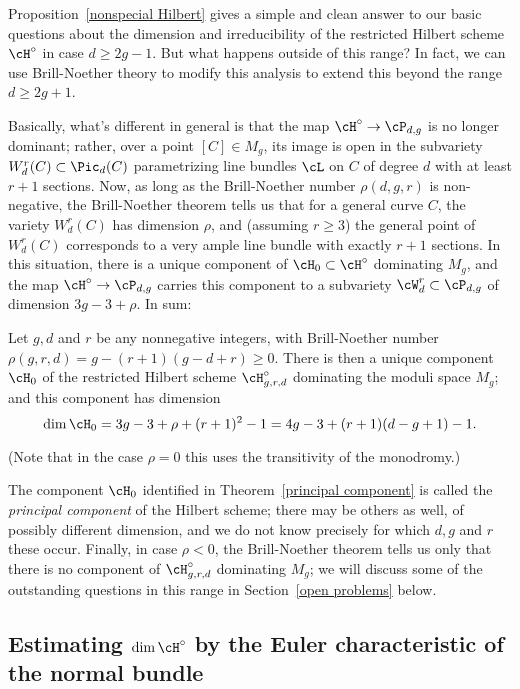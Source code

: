 Proposition~\ref{nonspecial Hilbert} gives a simple and clean answer to our basic questions about the dimension and irreducibility of the restricted Hilbert scheme $\cH^\circ$ in case $d \geq 2g-1$. But what happens outside of this range? In fact, we  can use Brill-Noether theory to modify this analysis to extend this beyond the range $d \geq 2g+1$.

Basically, what's different in general is that the map $\cH^\circ \to \cP_{d,g}$ is no longer dominant; rather, over a point $[C] \in M_g$, its image is open in the subvariety $W^r_d(C) \subset \Pic_d(C)$ parametrizing line bundles $\cL$ on $C$ of degree $d$ with at least $r+1$ sections. Now, as long as the Brill-Noether number $\rho(d,g,r)$ is non-negative, the Brill-Noether theorem tells us that for a general curve $C$, the variety $W^r_d(C)$ has dimension $\rho$, and (assuming $r \geq 3$) the general point of $W^r_d(C)$ corresponds to a very ample line bundle with exactly $r+1$ sections. In this situation, there is a unique component of $\cH_0 \subset \cH^\circ$ dominating $M_g$, and the map $\cH^\circ \to \cP_{d,g}$ carries this component to a subvariety $\cW^r_d \subset \cP_{d,g}$ of dimension $3g-3 + \rho$. In sum:

\begin{theorem}\label{principal component}
Let $g, d$ and $r$ be any nonnegative integers, with Brill-Noether number  $\rho(g,r,d) = g - (r+1)(g-d+r) \geq 0$. There is then a unique component $\cH_0$ of the restricted Hilbert scheme $\cH^\circ_{g,r,d}$ dominating the moduli space $M_g$; and this component has dimension
$$
\dim \cH_0 = 3g-3+\rho + (r+1)^2 - 1 = 4g-3 + (r+1)(d-g+1) - 1.
$$
\end{theorem}

(Note that in the case $\rho=0$ this uses the transitivity of the monodromy.) 


 The component $\cH_0$ identified in Theorem~\ref{principal component} is called the \emph{principal component} of the Hilbert scheme; there may be others as well, of possibly different dimension, and we do not know precisely for which $d,g$ and $r$ these occur. Finally, in case $\rho < 0$, the Brill-Noether theorem tells us only that there is no component of $\cH^\circ_{g,r,d}$ dominating $M_g$; we will discuss some of the outstanding questions in this range in Section~\ref{open problems} below. 


\subsection{Estimating $\dim \cH^\circ$ by the Euler characteristic of the normal bundle}

